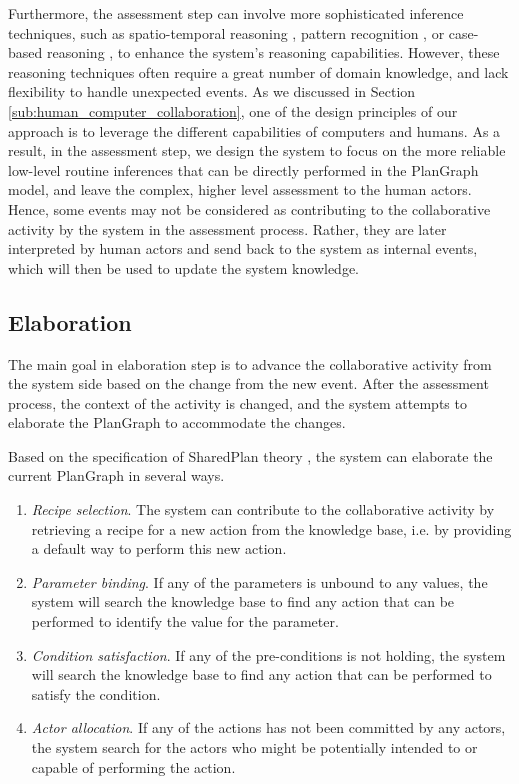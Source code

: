 Furthermore, the assessment step can involve more sophisticated inference techniques, such as spatio-temporal reasoning \cite{Bennett}, pattern recognition \cite{zelnik2001event}, or case-based reasoning \cite{jakobson2004towards}, to enhance the system's reasoning capabilities. However, these reasoning techniques often require a great number of domain knowledge, and lack flexibility to handle unexpected events. As we discussed in Section \ref{sub:human_computer_collaboration}, one of the design principles of our approach is to leverage the different capabilities of computers and humans. As a result, in the assessment step, we design the system to focus on the more reliable low-level routine inferences that can be directly performed in the PlanGraph model, and leave the complex, higher level assessment to the human actors. Hence,
some events may not be considered as contributing to the collaborative activity by the system in the assessment process. Rather, they are later interpreted by human actors and send back to the system as internal events, which will then be used to update the system knowledge.

\subsection{Elaboration} %
\label{sub:elaboration}
The main goal in elaboration step is to advance the collaborative activity from the system side based on the change from the new event. After the assessment process, the context of the activity is changed, and the system attempts to elaborate the PlanGraph to accommodate the changes. 

Based on the specification of SharedPlan theory \cite{Grosz2006}, the system can elaborate the current PlanGraph in several ways. 
\begin{enumerate}
	\item \emph{Recipe selection}. The system can contribute to the collaborative activity by retrieving a recipe for a new action from the knowledge base, i.e. by providing a default way to perform this new action.
	\item \emph{Parameter binding}. If any of the parameters is unbound to any values, the system will search the knowledge base to find any action that can be performed to identify the value for the parameter.
	\item \emph{Condition satisfaction}. If any of the pre-conditions is not holding, the system will search the knowledge base to find any action that can be performed to satisfy the condition.
	\item \emph{Actor allocation}. If any of the actions has not been committed by any actors, the system search for the actors who might be potentially intended to or capable of performing the action. 
\end{enumerate}

